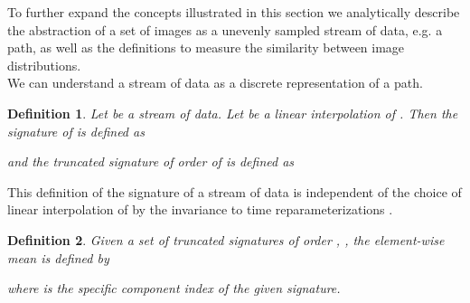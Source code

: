 \documentclass[lettersize,journal]{IEEEtran}
\newtheorem{definition}{Definition}
\begin{document}
\setlength{\tabcolsep}{4pt}
\begin{table}[H]
\begin{center}
\caption{RMSE and MAE, SIGNATURE and LOG-SIGNATURE across several iterations of training of Stylegan2-ada (lower is better). Our synthetic samples are generated using the model  which achieves the highest accuracy on RMSE and MAE, SIGNATURE and LOG-SIGNATURE.\\}
\label{table:rmse}
\end{center}
\end{table}
\setlength{\tabcolsep}{1.4pt}

To further expand the concepts illustrated in this section we analytically describe the abstraction of a set of images as a unevenly sampled stream of data, e.g. a path, as well as the definitions to measure the similarity between image distributions.
\\

We can understand a stream of data  as a discrete representation of a path. 

\begin{definition}\label{def:s}
	Let  be a stream of data. Let  be a linear interpolation of . Then the signature of  is defined as
	
	and the truncated signature of order  of  is defined as
	
\end{definition}

This definition of the signature of a stream of data is independent of the choice of linear interpolation of  by the invariance to time reparameterizations \cite{Bonnier2019}.
\\

\begin{definition}
    Given a set of truncated signatures of order , , the element-wise mean is defined by
    
	where  is the specific component index of the given signature.
\end{definition}
\end{document}
